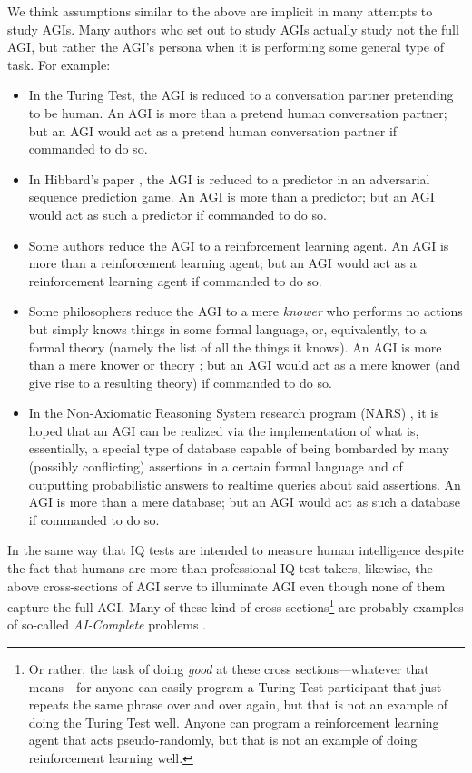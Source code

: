 \documentclass{article}
\begin{document}
We think assumptions similar to the above are implicit in many attempts to study AGIs.
Many authors who set out to study
AGIs actually study not the full AGI, but rather the AGI's persona when it is
performing some general type of task. For example:
\begin{itemize}
    \item
    In the Turing Test, the AGI is reduced to a conversation partner pretending to
    be human.
    An AGI is more than a pretend human conversation partner;
    but an AGI would act as a pretend human conversation partner
    if commanded to do so.
    \item
    In Hibbard's paper \cite{hibbard}, the AGI is reduced to a predictor in an
    adversarial sequence prediction game.
    An AGI is more than a predictor; but an AGI would
    act as such a predictor if commanded to do so.
    \item
    Some authors \cite{legg} \cite{hernandez}
    reduce the AGI to a reinforcement learning agent.
    An AGI is more than a reinforcement
    learning agent; but an AGI would
    act as a reinforcement learning agent if commanded to do so.
    \item
    Some philosophers
    reduce the AGI to a mere \emph{knower} who performs
    no actions but simply knows things in some formal language, or, equivalently,
    to a formal theory (namely the list of all the things it knows).
    An AGI is more than a mere knower
    or theory \cite{wang2007three};
    but an AGI would act as a mere knower (and give rise to a resulting theory)
    if commanded to do so.
    \item
    In the Non-Axiomatic Reasoning System research program (NARS) \cite{nars},
    it is hoped that an AGI can be realized via the implementation of what is,
    essentially, a special type of database capable of being bombarded by
    many (possibly conflicting) assertions in a certain formal language
    and of outputting probabilistic answers to realtime queries about said
    assertions. An AGI is more
    than a mere database; but
    an AGI would act as such a database if commanded to do so.
\end{itemize}
In the same way that IQ tests are intended to measure human intelligence despite
the fact that humans are more than professional IQ-test-takers,
likewise, the above cross-sections of AGI serve to illuminate AGI
even though none of them capture the full AGI. Many of these kind of
cross-sections\footnote{Or rather, the task of doing \emph{good} at these
cross sections---whatever
that means---for anyone can easily program a Turing Test participant that just
repeats the same phrase over and over again, but that is not an example of
doing the Turing Test well. Anyone can program a reinforcement learning agent that
acts pseudo-randomly, but that is not an example of doing reinforcement learning well.}
are probably examples of so-called \emph{AI-Complete} problems
\cite{yampolskiy2012ai} \cite{yampolskiy2013turing}.
\end{document}
